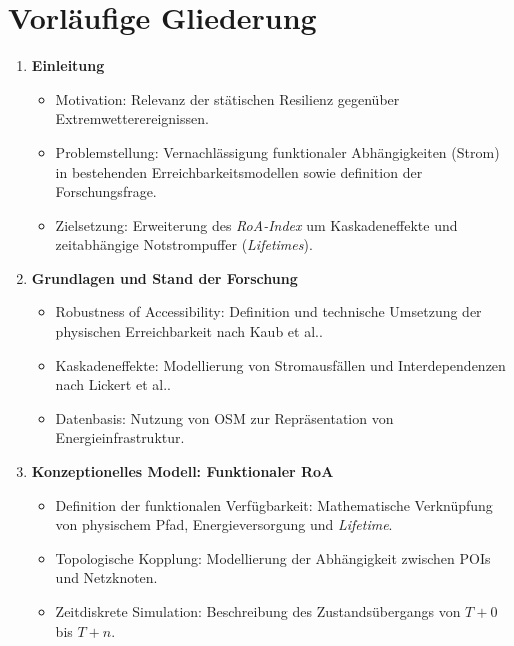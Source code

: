 

\section{Vorläufige Gliederung}
\label{sec:vorlaeufige_gliederung}



\begin{enumerate}
    \item \textbf{Einleitung}
    \begin{itemize}
        \item Motivation: Relevanz der stätischen Resilienz gegenüber Extremwetterereignissen.
        \item Problemstellung: Vernachlässigung funktionaler Abhängigkeiten (Strom) in bestehenden Erreichbarkeitsmodellen sowie definition der Forschungsfrage.
        \item Zielsetzung: Erweiterung des \textit{RoA-Index} um Kaskadeneffekte und zeitabhängige Notstrompuffer (\textit{Lifetimes}).
    \end{itemize}

    \item \textbf{Grundlagen und Stand der Forschung}
    \begin{itemize}
        \item Robustness of Accessibility: Definition und technische Umsetzung der physischen Erreichbarkeit nach Kaub et al.\cite{kaub2024}.
        \item Kaskadeneffekte: Modellierung von Stromausfällen und Interdependenzen nach Lickert et al.\cite{lickert2024}.
        \item Datenbasis: Nutzung von OSM zur Repräsentation von Energieinfrastruktur.
    \end{itemize}

    \item \textbf{Konzeptionelles Modell: Funktionaler RoA}
    \begin{itemize}
        \item Definition der funktionalen Verfügbarkeit: Mathematische Verknüpfung von physischem Pfad, Energieversorgung und \textit{Lifetime}.
        \item Topologische Kopplung: Modellierung der Abhängigkeit zwischen POIs und Netzknoten.
        \item Zeitdiskrete Simulation: Beschreibung des Zustandsübergangs von $T+0$ bis $T+n$.
    \end{itemize}


\end{enumerate}
